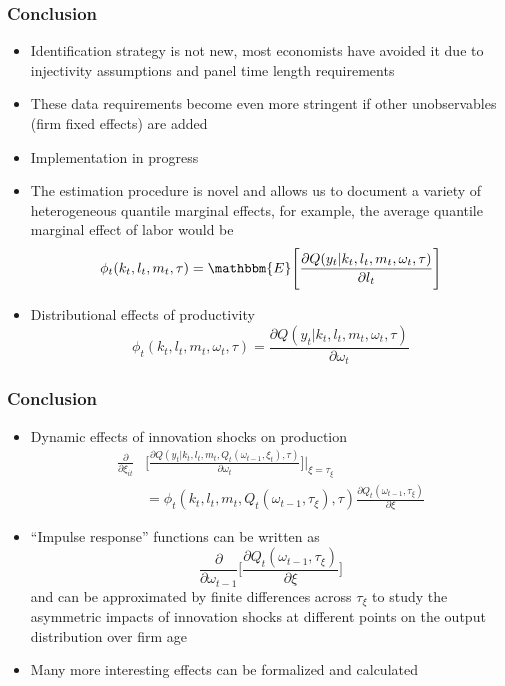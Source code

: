 \documentclass{beamer}
\begin{document}
\begin{frame}
\frametitle{Conclusion}
\begin{itemize}
	\item Identification strategy is not new, most economists have avoided it due to injectivity assumptions and panel time length requirements
	\item These data requirements become even more stringent if other unobservables (firm fixed effects) are added
	\item Implementation in progress
	\item The estimation procedure is novel and allows us to document a variety of heterogeneous quantile marginal effects, for example, the average quantile marginal effect of labor would be
	\begin{equation}
	\phi_{t}(k_{t}, l_{t}, m_{t}, \tau)=\mathbbm{E}\Bigg[\frac{\partial Q(y_{t}|k_{t}, l_{t}, m_{t}, \omega_{t}, \tau)}{\partial l_{t}}\Bigg]
	\end{equation}
	\item Distributional effects of productivity
	\begin{equation}
	\phi_{t}(k_{t}, l_{t}, m_{t}, \omega_{t}, \tau)=\frac{\partial Q(y_{t}|k_{t}, l_{t}, m_{t}, \omega_{t}, \tau)}{\partial \omega_{t}}
	\end{equation}
\end{itemize}
\end{frame}


\begin{frame}
\frametitle{Conclusion}
\begin{itemize}
	\item Dynamic effects of innovation shocks on production
	\begin{equation}
	\begin{split}
	\frac{\partial}{\partial \xi_{it}}&\Bigg[\frac{\partial Q(y_{t}|k_{t}, l_{t}, m_{t}, Q_{t}(\omega_{t-1}, \xi_{t}), \tau)}{\partial \omega_{t}}\Bigg]\Bigg|_{\xi=\tau_{\xi}}\\
	&=\phi_{t}(k_{t}, l_{t}, m_{t}, Q_{t}(\omega_{t-1}, \tau_{\xi}), \tau)\frac{\partial Q_{t}(\omega_{t-1}, \tau_{\xi})}{\partial \xi}
	\end{split}
	\end{equation}
	\item ``Impulse response'' functions can be written as
	\begin{equation}
	\frac{\partial}{\partial \omega_{t-1}}\Bigg[\frac{\partial Q_{t}(\omega_{t-1}, \tau_{\xi})}{\partial \xi}\Bigg]
	\end{equation}
	and can be approximated by finite differences across $\tau_{\xi}$ to study the asymmetric impacts of innovation shocks at different points on the output distribution over firm age
	\item Many more interesting effects can be formalized and calculated
\end{itemize}

\end{frame}
\end{document}
